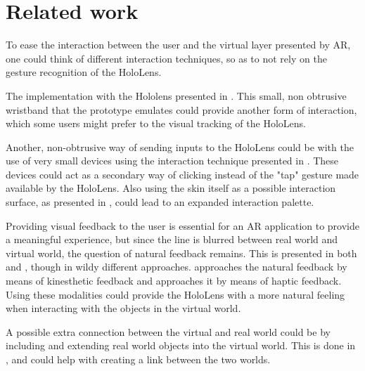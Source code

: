 
\section{Related work}
To ease the interaction between the user and the virtual layer presented by AR, one could think of different interaction techniques, so as to not rely on the gesture recognition of the HoloLens.\par
The implementation with the Hololens presented in \cite{watchsense}. This small, non obtrusive wristband that the prototype emulates could provide another form of interaction, which some users might prefer to the visual tracking of the HoloLens.\par
Another, non-obtrusive way of sending inputs to the HoloLens could be with the use of very small devices using the interaction technique presented in \cite{back}. These devices could act as a secondary way of clicking instead of the "tap" gesture made available by the HoloLens. Also using the skin itself as a possible interaction surface, as presented in \cite{skin}, could lead to an expanded interaction palette.\par
Providing visual feedback to the user is essential for an AR application to  provide a meaningful experience, but since the line is blurred between real world and virtual world, the question of natural feedback remains. This is presented in both \cite{stroem} and \cite{finger}, though in wildy different approaches. \cite{stroem} approaches the natural feedback by means of kinesthetic feedback and \cite{finger} approaches it by means of haptic feedback. Using these modalities could provide the HoloLens with a more natural feeling when interacting with the objects in the virtual world.\par
A possible extra connection between the virtual and real world could be by including and extending real world objects into the virtual world. This is done in \cite{multifi}, and could help with creating a link between the two worlds. 